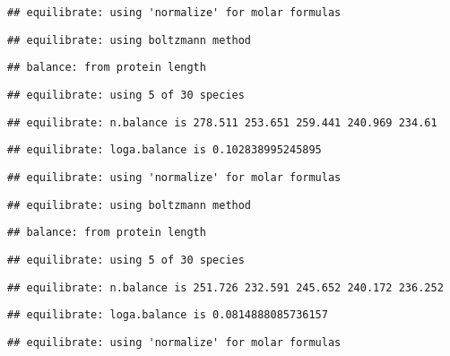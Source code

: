 \documentclass[]{article}
\begin{document}
\begin{verbatim}
## equilibrate: using 'normalize' for molar formulas
\end{verbatim}

\begin{verbatim}
## equilibrate: using boltzmann method
\end{verbatim}

\begin{verbatim}
## balance: from protein length
\end{verbatim}

\begin{verbatim}
## equilibrate: using 5 of 30 species
\end{verbatim}

\begin{verbatim}
## equilibrate: n.balance is 278.511 253.651 259.441 240.969 234.61
\end{verbatim}

\begin{verbatim}
## equilibrate: loga.balance is 0.102838995245895
\end{verbatim}

\begin{verbatim}
## equilibrate: using 'normalize' for molar formulas
\end{verbatim}

\begin{verbatim}
## equilibrate: using boltzmann method
\end{verbatim}

\begin{verbatim}
## balance: from protein length
\end{verbatim}

\begin{verbatim}
## equilibrate: using 5 of 30 species
\end{verbatim}

\begin{verbatim}
## equilibrate: n.balance is 251.726 232.591 245.652 240.172 236.252
\end{verbatim}

\begin{verbatim}
## equilibrate: loga.balance is 0.0814888085736157
\end{verbatim}

\begin{verbatim}
## equilibrate: using 'normalize' for molar formulas
\end{verbatim}
\end{document}
